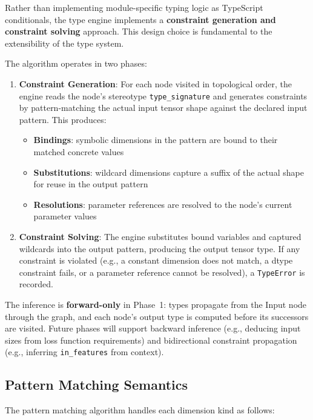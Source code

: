 \documentclass[11pt,a4paper]{article}
\begin{document}
Rather than implementing module-specific typing logic as TypeScript conditionals, the type engine implements a \textbf{constraint generation and constraint solving} approach. This design choice is fundamental to the extensibility of the type system.

The algorithm operates in two phases:

\begin{enumerate}
	\item \textbf{Constraint Generation}: For each node visited in topological order, the engine reads the node's stereotype \texttt{type\_signature} and generates constraints by pattern-matching the actual input tensor shape against the declared input pattern. This produces:
	      \begin{itemize}
		      \item \textbf{Bindings}: symbolic dimensions in the pattern are bound to their matched concrete values
		      \item \textbf{Substitutions}: wildcard dimensions capture a suffix of the actual shape for reuse in the output pattern
		      \item \textbf{Resolutions}: parameter references are resolved to the node's current parameter values
	      \end{itemize}

	\item \textbf{Constraint Solving}: The engine substitutes bound variables and captured wildcards into the output pattern, producing the output tensor type. If any constraint is violated (e.g., a constant dimension does not match, a dtype constraint fails, or a parameter reference cannot be resolved), a \texttt{TypeError} is recorded.
\end{enumerate}

The inference is \textbf{forward-only} in Phase~1: types propagate from the Input node through the graph, and each node's output type is computed before its successors are visited. Future phases will support backward inference (e.g., deducing input sizes from loss function requirements) and bidirectional constraint propagation (e.g., inferring \texttt{in\_features} from context).

\subsection{Pattern Matching Semantics}

The pattern matching algorithm handles each dimension kind as follows:
\end{document}
